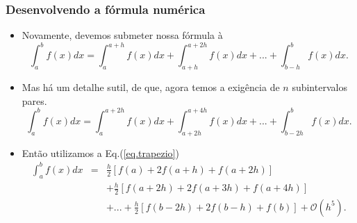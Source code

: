 \documentclass[xcolor=table]{beamer}
\newenvironment{stepitemize}{\begin{itemize}[<+->]}{\end{itemize} }
\begin{document}
\begin{frame}%

\frametitle{Desenvolvendo a f\'{o}rmula num\'{e}rica}

\begin{stepitemize}
\item Novamente, devemos submeter nossa f\'{o}rmula \`{a}%
\[
\int_{a}^{b}f\left( x\right) dx=\int_{a}^{a+h}f\left( x\right)
dx+\int_{a+h}^{a+2h}f\left( x\right) dx+...+\int_{b-h}^{b}f\left( x\right)
dx. 
\]

\item Mas h\'{a} um detalhe sutil, de que, agora temos a exig\^{e}ncia de $n$
subintervalos pares.%
\[
\int_{a}^{b}f\left( x\right) dx=\int_{a}^{a+2h}f\left( x\right)
dx+\int_{a+2h}^{a+4h}f\left( x\right) dx+...+\int_{b-2h}^{b}f\left( x\right)
dx.
\]

\item Ent\~{a}o utilizamos a Eq.(\ref{eq.trapezio})%
\begin{eqnarray*}
\int_{a}^{b}f\left( x\right) dx &=&\frac{h}{2}\left[ f\left( a\right)
+2f\left( a+h\right) +f\left( a+2h\right) \right] \\
&&+\frac{h}{2}\left[ f\left( a+2h\right) +2f\left( a+3h\right) +f\left(
a+4h\right) \right] \\
&&+...+\frac{h}{2}\left[ f\left( b-2h\right) +2f\left( b-h\right) +f\left(
b\right) \right] +\mathcal{O}\left( h^{5}\right) .
\end{eqnarray*}
\end{stepitemize}

\transboxout%
\end{frame}%
\end{document}
